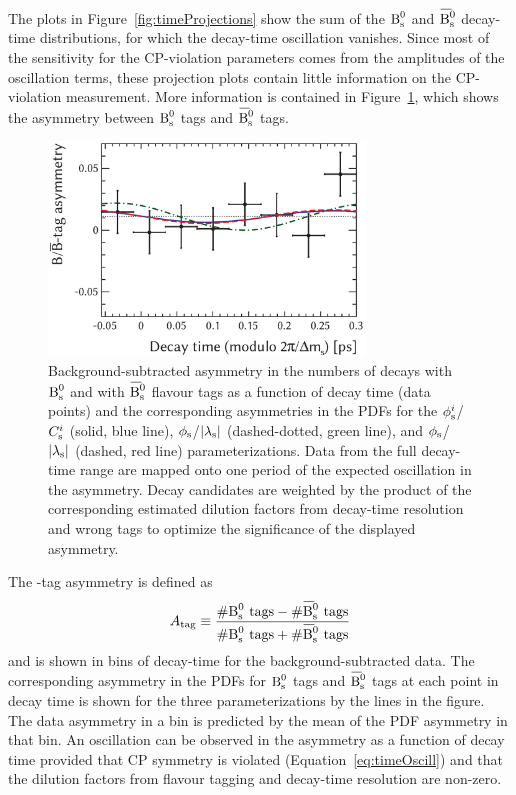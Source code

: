 The plots in Figure~\ref{fig:timeProjections} show the sum of the $\text{B}_\text{s}^\text{0}$ and $\Bsbar$ decay-time distributions, for which the decay-time
oscillation vanishes. Since most of the sensitivity for the CP-violation parameters comes from the amplitudes of the oscillation terms,
these projection plots contain little information on the CP-violation measurement. More information is contained in
Figure~\ref{fig:BBbarAsymmetry}, which shows the asymmetry between $\text{B}_\text{s}^\text{0}$ tags and $\Bsbar$ tags.
\begin{figure}[htb]
  \centering
  \includegraphics[width=0.75\textwidth]{graphics/results/asym}
  \caption{Background-subtracted asymmetry in the numbers of decays with $\text{B}_\text{s}^\text{0}$ and with $\Bsbar$ flavour tags as a function of decay time
           (data points) and the corresponding asymmetries in the PDFs for the $\phi_\text{s}^{i}$/$C_\text{s}^{i}$ (solid, blue line),
           $\phi_\text{s}$/$|{\lambda_{\text{s}}}|$ (dashed-dotted, green line), and $\phi_\text{s}$/$|{\lambda_{\text{s}}}|$ (dashed, red line) parameterizations.
           Data from the full decay-time range are mapped onto one period of the expected oscillation in the asymmetry.
           Decay candidates are weighted by the product of the corresponding estimated dilution factors from decay-time resolution
           and wrong tags to optimize the significance of the displayed asymmetry.}
  \label{fig:BBbarAsymmetry}
\end{figure}

The \BsBsbar-tag asymmetry is defined as
\[
  A_{\text{tag}} \equiv \frac{\#\Bs{}\text{ tags} - \#\Bsbar{}\text{ tags}}{\#\Bs{}\text{ tags} + \#\Bsbar{}\text{ tags}}
\]
and is shown in bins of decay-time for the background-subtracted data. The corresponding asymmetry in the PDFs for $\text{B}_\text{s}^\text{0}$ tags and $\Bsbar$
tags at each point in decay time is shown for the three parameterizations by the lines in the figure. The data asymmetry in a bin is
predicted by the mean of the PDF asymmetry in that bin. An oscillation can be observed in the asymmetry as a function of decay time
provided that CP symmetry is violated (Equation~\ref{eq:timeOscill}) and that the dilution factors from flavour tagging and decay-time
resolution are non-zero.

